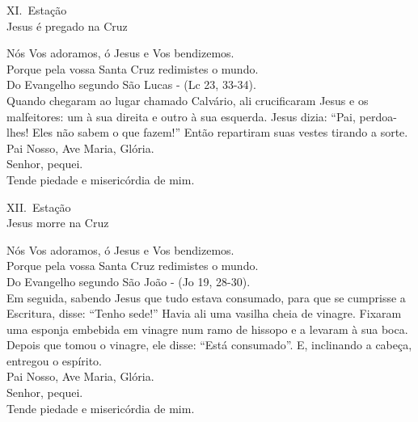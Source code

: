 \documentclass{book}
\begin{document}
\begin{center}
    XI.\ Estação \\ Jesus é pregado na Cruz
\end{center}
\begin{flushleft}
    \VbarRed{} Nós Vos adoramos, ó Jesus e Vos bendizemos. \\
    \RbarRed{} Porque pela vossa Santa Cruz redimistes o mundo.
    \vspace{.2cm} \\
    Do Evangelho segundo São Lucas - (\textcolor{VioletRed2}{Lc 23, 33-34}).
    \vspace{.2cm} \\
    Quando chegaram ao lugar chamado Calvário, ali crucificaram Jesus e os malfeitores: um à sua direita e outro à sua esquerda. Jesus dizia: ``Pai, perdoa-lhes! Eles não sabem o que fazem!'' Então repartiram suas vestes tirando a sorte.
    \vspace{.2cm} \\
    Pai Nosso, Ave Maria, Glória.
    \vspace{.2cm} \\
    \VbarRed{} Senhor, pequei. \\
    \RbarRed{} Tende piedade e misericórdia de mim.
\end{flushleft}
\begin{center}
    XII.\ Estação \\ Jesus morre na Cruz
\end{center}
\begin{flushleft}
    \VbarRed{} Nós Vos adoramos, ó Jesus e Vos bendizemos. \\
    \RbarRed{} Porque pela vossa Santa Cruz redimistes o mundo.
    \vspace{.2cm} \\
    Do Evangelho segundo São João - (\textcolor{VioletRed2}{Jo 19, 28-30}).
    \vspace{.2cm} \\
    Em seguida, sabendo Jesus que tudo estava consumado, para que se cumprisse a Escritura, disse: ``Tenho sede!'' Havia ali uma vasilha cheia de vinagre. Fixaram uma esponja embebida em vinagre num ramo de hissopo e a levaram à sua boca. Depois que tomou o vinagre, ele disse: ``Está consumado''. E, inclinando a cabeça, entregou o espírito.
    \vspace{.2cm} \\
    Pai Nosso, Ave Maria, Glória.
    \vspace{.2cm} \\
    \VbarRed{} Senhor, pequei. \\
    \RbarRed{} Tende piedade e misericórdia de mim.
\end{flushleft}
\end{document}
